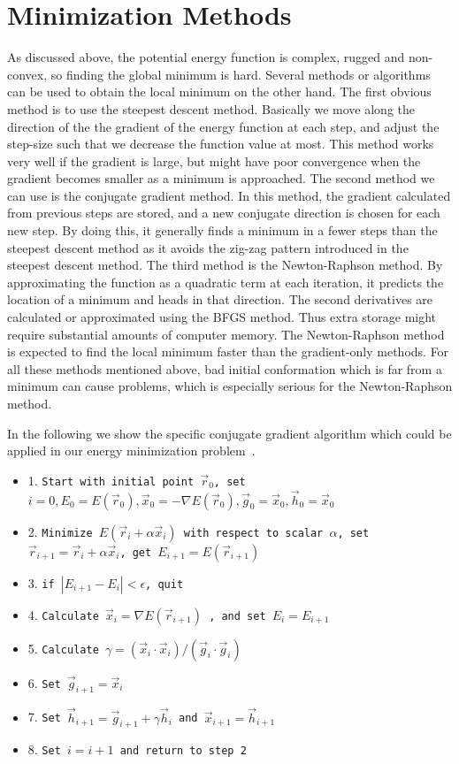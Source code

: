 \documentclass{article} %
\begin{document}
\section{Minimization Methods}
As discussed above, the potential energy function is complex, rugged and non-convex, so finding the global minimum is hard. Several methods or algorithms
can be used to obtain the local minimum on the other hand. The first obvious method is to use the steepest descent method. Basically we move 
along the direction of the the gradient of the energy function at each step, and adjust the step-size such that we decrease the function value at most.
This method works very well if the gradient is large, but might have poor convergence when the gradient becomes smaller as a minimum is approached.
The second method we can use is the conjugate gradient method. In this method, the gradient calculated from previous steps are stored, and a new
conjugate direction is chosen for each new step. By doing this, it generally finds a minimum in a fewer steps than the steepest descent method as it
avoids the zig-zag pattern introduced in the steepest descent method. The third method is the Newton-Raphson method. By approximating the function as 
a quadratic term at each iteration, it predicts the location of a minimum and heads in that direction. The second derivatives are calculated or approximated
using the BFGS method. Thus extra storage might require substantial amounts of computer memory.  The Newton-Raphson method is expected to find
 the local minimum faster than the gradient-only methods. For all these methods mentioned above, bad initial conformation which is far from a
minimum can cause problems, which is especially serious for the Newton-Raphson method.


In the following we show the specific conjugate gradient algorithm which could be applied in our energy minimization problem~\cite{conjucate}. 
\begin{itemize}
\item 1. \texttt{Start with initial point $\vec{r}_0$, set $i=0, E_0=E(\vec{r}_0), \vec{x}_0 = -\nabla E(\vec{r}_0), \vec{g}_0=\vec{x}_0, \vec{h}_0=\vec{x}_0$  }
\item 2. \texttt{Minimize $E(\vec{r}_i+\alpha \vec{x}_i)$ with respect to scalar $\alpha$, set $\vec{r}_{i+1}= \vec{r}_i +\alpha \vec{x}_i$, get $E_{i+1}= E(\vec{r}_{i+1})$ }
\item 3. \texttt{if $|E_{i+1} - E_{i}| < \epsilon$, quit }
\item 4. \texttt{Calculate $\vec{x}_i=\nabla E(\vec{r}_{i+1})$ , and set $E_i=E_{i+1}$}
\item 5. \texttt{Calculate $\gamma = (\vec{x}_i\cdot \vec{x}_i)/(\vec{g}_i\cdot \vec{g}_i)$  }
\item 6. \texttt{Set $\vec{g}_{i+1} = \vec{x}_i$}
\item 7. \texttt{Set $\vec{h}_{i+1} = \vec{g}_{i+1} +\gamma \vec{h}_i$ and $\vec{x}_{i+1} =\vec{h}_{i+1}$}
\item 8. \texttt{Set $i=i+1$ and return to step 2 } 
\end{itemize}
\end{document}
